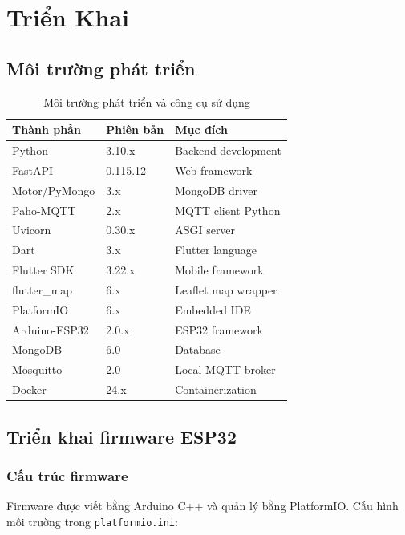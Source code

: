 \chapter{Triển Khai}

\section{Môi trường phát triển}

\begin{table}[H]
\centering
\caption{Môi trường phát triển và công cụ sử dụng}
\label{tab:dev_env}
\begin{tabularx}{\textwidth}{l l X}
\toprule
\textbf{Thành phần} & \textbf{Phiên bản} & \textbf{Mục đích} \\
\midrule
Python        & 3.10.x    & Backend development \\
FastAPI       & 0.115.12  & Web framework \\
Motor/PyMongo & 3.x       & MongoDB driver \\
Paho-MQTT     & 2.x       & MQTT client Python \\
Uvicorn       & 0.30.x    & ASGI server \\
\midrule
Dart          & 3.x       & Flutter language \\
Flutter SDK   & 3.22.x    & Mobile framework \\
flutter\_map  & 6.x       & Leaflet map wrapper \\
\midrule
PlatformIO    & 6.x       & Embedded IDE \\
Arduino-ESP32 & 2.0.x     & ESP32 framework \\
\midrule
MongoDB       & 6.0       & Database \\
Mosquitto     & 2.0       & Local MQTT broker \\
Docker        & 24.x      & Containerization \\
\bottomrule
\end{tabularx}
\end{table}

\section{Triển khai firmware ESP32}

\subsection{Cấu trúc firmware}

Firmware được viết bằng Arduino C++ và quản lý bằng PlatformIO. Cấu hình môi trường trong \texttt{platformio.ini}:

